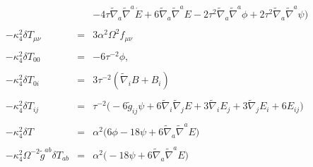 \documentclass[10pt,letterpaper]{article}
\numberwithin{equation}{section}
\begin{document}
\begin{eqnarray}
&& - 4 \tau \tilde \nabla_{a}\tilde \nabla^{a}\dot{E}
+ 6 \tilde \nabla_{a}\tilde \nabla^{a}E
- 2 \tau^2 \tilde \nabla_{a}\tilde \nabla^{a}\phi
+ 2 \tau^2 \tilde \nabla_{a}\tilde \nabla^{a}\psi\big)
\\ \nonumber \\
-\kappa_4^2 \delta T_{\mu\nu} &=& 3\alpha^2\Omega^2 f_{\mu\nu} 
\\ \nonumber\\
-\kappa^2_4\delta T_{00} &=& -6\tau^{-2}\phi,\qquad 
\\ \nonumber\\
-\kappa^2_4\delta T_{0i}&=& 3\tau^{-2}(\tilde \nabla_i B + B_i)
\\ \nonumber\\
-\kappa^2_4\delta T_{ij} &=& \tau^{-2}\big(-6 \tilde g_{ij}\psi + 6\tilde\nabla_i\tilde \nabla_j E + 3\tilde \nabla_i E_j + 3\tilde \nabla_j E_i + 6E_{ij}\big)
\\ \nonumber\\
-\kappa^2_4 \delta T &=& \alpha^2 \big(6\phi-18\psi+6\tilde\nabla_a\tilde\nabla^a E \big)
\\ \nonumber\\
-\kappa^2_4\Omega^{-2}\tilde g^{ab} \delta T_{ab} &=& \alpha^2\big(-18\psi + 6\tilde\nabla_a\tilde \nabla^a E\big)
\end{eqnarray}
%
%
%
\end{document}
